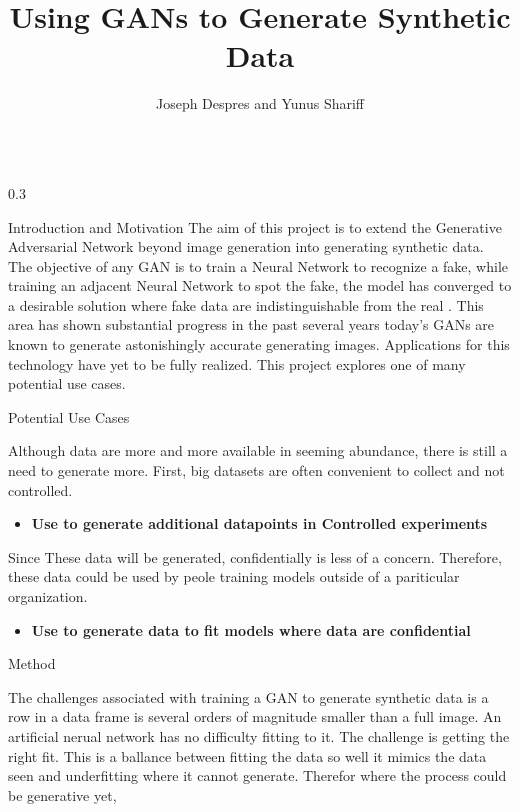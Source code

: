 \documentclass{msuposter}
\title{Using GANs to Generate Synthetic Data}
\author{Joseph Despres and Yunus Shariff}
\institute{Michigan State University}
\newcommand{\colwidth}{0.3\linewidth}
\begin{document}
\begin{frame}{}
\begin{columns}[t]

\begin{column}{\colwidth}

\begin{block}{Introduction and Motivation}
The aim of this project is to extend the Generative Adversarial Network beyond image generation into generating synthetic data. The objective of any GAN is to train a Neural Network to recognize a fake, while training an adjacent Neural Network to spot the fake, the model has converged to a desirable solution where fake data are indistinguishable from the real \cite{NIPS2014_5ca3e9b1}.  This area has shown substantial progress in the past several years today's GANs are known to generate astonishingly accurate generating images. Applications for this technology have yet to be fully realized. This project explores one of many potential use cases.\cite{map}

\end{block}

\begin{block}{Potential Use Cases}

Although data are more and more available in seeming abundance, there is still a need to generate more. First, big datasets are often convenient to collect and not controlled.

\begin{itemize}
	\item \textbf{Use to generate additional datapoints in Controlled experiments}
\end{itemize}

Since These data will be generated, confidentially is less of a concern. Therefore, these data could be used by peole training models outside of a pariticular organization.

\begin{itemize}
	\item \textbf{Use to generate data to fit models where data are confidential}
	
\end{itemize}

\end{block}

\begin{block}{Method}

The challenges associated with training a GAN to generate synthetic data is a row in a data frame is several orders of magnitude smaller than a full image. An artificial nerual network has no difficulty fitting to it. The challenge is getting the right fit. This is a ballance between fitting the data so well it mimics the data seen and underfitting where it cannot generate. Therefor  where the process could be generative yet, 


\end{block}
\end{column}
\end{columns}
\end{frame}
\end{document}
